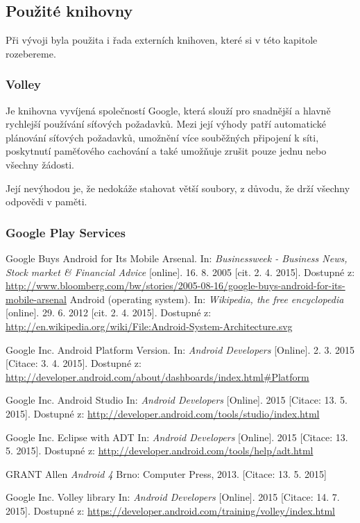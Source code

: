 \documentclass[12pt]{article}
\begin{document}
\subsection{Použité knihovny}
Při vývoji byla použita i řada externích knihoven, které si v této kapitole rozebereme.
\subsubsection{Volley}
Je knihovna vyvíjená společností Google, která slouží pro snadnější a hlavně rychlejší používání síťových požadavků. Mezi její výhody patří automatické plánování síťových požadavků, umožnění více souběžných připojení k síti, poskytnutí paměťového cachování a také umožňuje zrušit pouze jednu nebo všechny žádosti.

Její nevýhodou je, že nedokáže stahovat větší soubory, z důvodu, že drží všechny odpovědi v paměti.\cite{volley}
\subsubsection{Google Play Services}

\newpage
\begin{thebibliography}{1} %
 Google Buys Android for Its Mobile Arsenal. In: \emph{Businessweek - Business News, Stock market \& Financial Advice} [online]. 16. 8. 2005 [cit. 2. 4. 2015]. Dostupné
z: \url{http://www.bloomberg.com/bw/stories/2005-08-16/google-buys-android-for-its-mobile-arsenal}
 Android (operating system). In: \emph{Wikipedia, the free encyclopedia} [online]. 29. 6. 2012 [cit. 2. 4. 2015]. Dostupné z: \url{http://en.wikipedia.org/wiki/File:Android-System-Architecture.svg}

 Google Inc. Android Platform Version. In: \emph{Android Developers}
[Online]. 2. 3. 2015 [Citace: 3. 4. 2015]. Dostupné z: \url{http://developer.android.com/about/dashboards/index.html#Platform}

 Google Inc. Android Studio In: \emph{Android Developers}
[Online]. 2015 [Citace: 13. 5. 2015]. Dostupné z: \url{http://developer.android.com/tools/studio/index.html}

 Google Inc. Eclipse with ADT In: \emph{Android Developers}
[Online]. 2015 [Citace: 13. 5. 2015]. Dostupné z: \url{http://developer.android.com/tools/help/adt.html}

 GRANT Allen \emph{Android 4}
	Brno: Computer Press, 2013.
		[Citace: 13. 5. 2015]

 Google Inc. Volley library In: \emph{Android Developers}
[Online]. 2015 [Citace: 14. 7. 2015]. Dostupné z:
\url{https://developer.android.com/training/volley/index.html}
\end{thebibliography}
\end{document}
